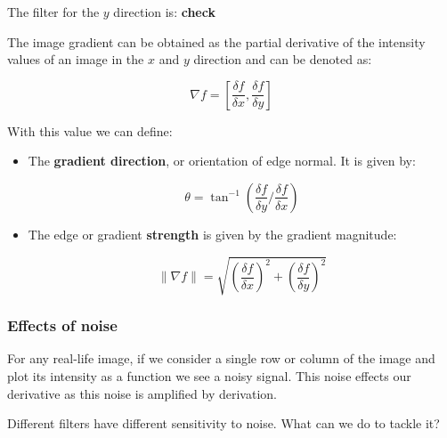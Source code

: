 \documentclass{article}
\begin{document}
The filter for the $y$ direction is: \textbf{check}

\begin{center}
\end{center}

The image gradient can be obtained as the partial derivative of the intensity values of an image in the $x$ and $y$ direction and can be denoted as:

\[
  \nabla f = \left[ \frac{\delta f}{\delta x}, \frac{\delta f}{\delta y}\right]
\]

With this value we can define:

\begin{itemize}
  \item The \textbf{gradient direction}, or orientation of edge normal. It is given by:

        \[
        \theta = \tan^{-1}(\frac{\delta f}{\delta y}/ \frac{\delta f}{\delta x})
        \]

  \item The edge or gradient \textbf{strength} is given by the gradient magnitude:

        \[
        \| \nabla f \| = \sqrt{\left(\frac{\delta f}{\delta x}\right)^{2} + \left(\frac{\delta f}{\delta y}\right)^{2}}
        \]


\end{itemize}

\subsubsection{Effects of noise}

For any real-life image, if we consider a single row or column of the image and plot its intensity as a function we see a noisy signal. This noise effects our derivative as this noise is amplified by derivation.

Different filters have different sensitivity to noise. What can we do to tackle it?
\end{document}
